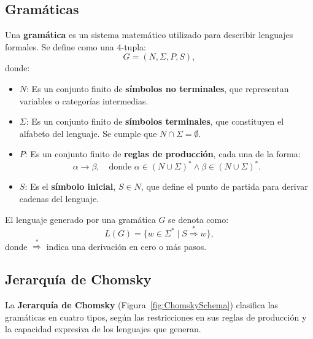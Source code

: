 \documentclass{article}
\begin{document}
\subsection{Gramáticas}

Una \textbf{gramática} es un sistema matemático utilizado para describir lenguajes formales. Se define como una 4-tupla:
\[
      G = (N, \Sigma, P, S),
\]
donde:
\begin{itemize}
      \item \(N\): Es un conjunto finito de \textbf{símbolos no terminales}, que representan variables o categorías intermedias.
      \item \(\Sigma\): Es un conjunto finito de \textbf{símbolos terminales}, que constituyen el alfabeto del lenguaje. Se cumple que \(N \cap \Sigma = \emptyset\).
      \item \(P\): Es un conjunto finito de \textbf{reglas de producción}, cada una de la forma:
            \[
                  \alpha \to \beta, \quad \text{donde } \alpha \in (N \cup \Sigma)^* \wedge \beta \in (N \cup \Sigma)^*.
            \]
      \item \(S\): Es el \textbf{símbolo inicial}, \(S \in N\), que define el punto de partida para derivar cadenas del lenguaje.
\end{itemize}

El lenguaje generado por una gramática \(G\) se denota como:
\[
      L(G) = \{ w \in \Sigma^* \mid S \overset{*}{\Rightarrow} w \},
\]
donde \(\overset{*}{\Rightarrow}\) indica una derivación en cero o más pasos.

\subsection{Jerarquía de Chomsky}

La \textbf{Jerarquía de Chomsky} (Figura~\ref{fig:ChomskySchema}) clasifica las gramáticas en cuatro tipos, según las restricciones en sus reglas de producción y la capacidad expresiva de los lenguajes que generan.
\end{document}
